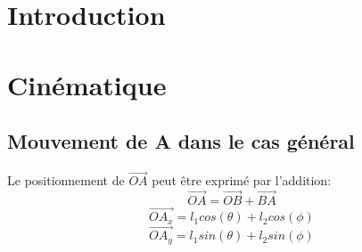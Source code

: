 \documentclass{udes_rapport} %
\begin{document}




\newpage

\tableofcontents
\newpage


\listoffigures
\newpage



\setcounter{page}{1} %
\section{Introduction}

\section{Cinématique}
\subsection{Mouvement de A dans le cas général}
Le positionnement de $\overrightarrow{OA}$ peut être exprimé par l'addition:
\begin{equation}
	\overrightarrow{OA} = \overrightarrow{OB} + \overrightarrow{BA}
\end{equation}
	\[	\overrightarrow{OA_x} = l_1 cos(\theta) + l_2 cos(\phi) 			\]
	\[	\overrightarrow{OA_y} = l_1 sin(\theta) + l_2 sin(\phi)			\]
\end{document}
